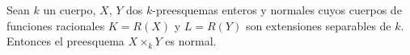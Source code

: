 \begin{corollary}[6.14.3]
\label{IV.2.s6.14.3-fr}
Sean $k$ un cuerpo, $X$, $Y$ dos $k$-preesquemas enteros y normales
cuyos cuerpos de funciones racionales $K=R(X)$ y $L=R(Y)$ son
extensiones separables de $k$. Entonces el preesquema $X\times_k Y$
es normal.
\end{corollary}

